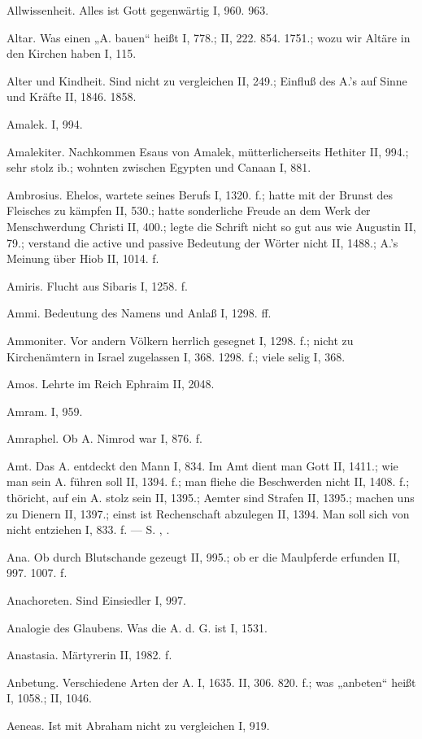 Allwissenheit. Alles ist Gott gegenwärtig I, 960. 963.

Altar. Was einen „A. bauen“ heißt I, 778.; II, 222. 854. 1751.; wozu wir Altäre in den Kirchen haben I, 115.

Alter und Kindheit. Sind nicht zu vergleichen II, 249.; Einfluß des A.’s auf Sinne und Kräfte II, 1846. 1858.

Amalek. I, 994.

Amalekiter. Nachkommen Esaus von Amalek, mütterlicherseits Hethiter II, 994.; sehr stolz ib.; wohnten zwischen Egypten und Canaan I, 881.

Ambrosius. Ehelos, wartete seines Berufs I, 1320. f.; hatte mit der Brunst des Fleisches zu kämpfen II, 530.; hatte sonderliche Freude an dem Werk der Menschwerdung Christi II, 400.; legte die Schrift nicht so gut aus wie Augustin II, 79.; verstand die active und passive Bedeutung der Wörter nicht II, 1488.; A.’s Meinung über Hiob II, 1014. f.

Amiris. Flucht aus Sibaris I, 1258. f.

Ammi. Bedeutung des Namens und Anlaß I, 1298. ff.

Ammoniter. Vor andern Völkern herrlich gesegnet I, 1298. f.; nicht zu Kirchenämtern in Israel zugelassen I, 368. 1298. f.; viele selig I, 368.

Amos. Lehrte im Reich Ephraim II, 2048.

Amram. I, 959.

Amraphel. Ob A. Nimrod war I, 876. f.

Amt. Das A. entdeckt den Mann I, 834. Im Amt dient man Gott II, 1411.; wie man sein A. führen soll II, 1394. f.; man fliehe die Beschwerden nicht II, 1408. f.; thöricht, auf ein A. stolz sein II, 1395.; Aemter sind Strafen II, 1395.; machen uns zu Dienern II, 1397.; einst ist Rechenschaft abzulegen II, 1394. Man soll sich von  nicht entziehen I, 833. f. — S. , .

Ana. Ob durch Blutschande gezeugt II, 995.; ob er die Maulpferde erfunden II, 997. 1007. f.

Anachoreten. Sind Einsiedler I, 997.

Analogie des Glaubens. Was die A. d. G. ist I, 1531.

Anastasia. Märtyrerin II, 1982. f.

Anbetung. Verschiedene Arten der A. I, 1635. II, 306. 820. f.; was „anbeten“ heißt I, 1058.; II, 1046.

Aeneas. Ist mit Abraham nicht zu vergleichen I, 919.

